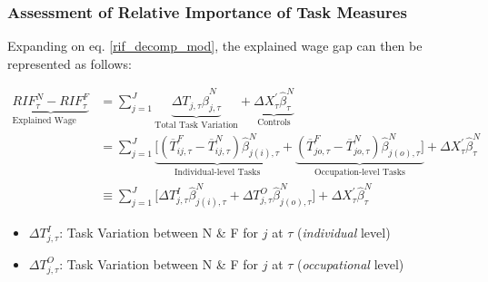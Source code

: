 \documentclass[10pt]{beamer}
\begin{document}
\begin{frame} 
	\frametitle{Assessment of Relative Importance of Task Measures}
	
	Expanding on eq. \eqref{rif_decomp_mod}, the explained wage gap can then be represented as follows:
	
	\begin{center}
		\begin{equation} \label{task_ind_occ_breakdown}
		\begin{aligned}
		\underbrace{RIF_{\tau}^{N} - RIF_{\tau}^{F}}_\text{Explained Wage Gap} &= \sum_{j=1}^{J} \underbrace{\Delta T_{j, \tau} \hat{\beta}_{j, \tau}^{N}}_\text{Total Task Variation} + \underbrace{\Delta X_{\tau}^{'} \hat{\beta}_{\tau}^{N}}_\text{Controls}\\
		&= \sum_{j=1}^{J} \underbrace{\Big[(\overline{T}_{ij, \tau}^{F} - \overline{T}_{ij, \tau}^{N}) \hat{\beta}_{j(i), \tau}^{N}}_\text{Individual-level Tasks} + \underbrace{(\overline{T}_{jo, \tau}^{F} - \overline{T}_{jo, \tau}^{N})\hat{\beta}_{j(o), \tau}^{N}\Big]}_\text{Occupation-level Tasks}  + \Delta X_{\tau}^{'} \hat{\beta}_{\tau}^{N}\\
		&\equiv \sum_{j=1}^{J} \Big[ \Delta T_{j, \tau}^{I} \hat{\beta}_{j(i), \tau}^{N} + \Delta T_{j, \tau}^{O} \hat{\beta}_{j(o), \tau}^{N} \Big] + \Delta X_{\tau}^{'} \hat{\beta}_{\tau}^{N}
		\end{aligned}
		\end{equation} 
	\end{center}
	
	\begin{itemize}
		\item $\Delta T_{j, \tau}^{I}$: Task Variation between N \& F for $j$ at $\tau$ (\textit{individual} level)
		\item $\Delta T_{j, \tau}^{O}$: Task Variation between N \& F for $j$ at $\tau$ (\textit{occupational} level)
	\end{itemize}
	
	
\end{frame}
\end{document}
